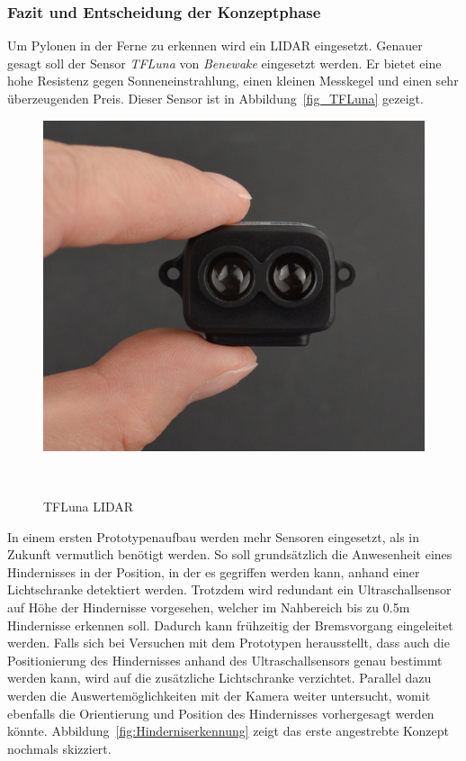 \documentclass[main.tex]{subfiles} %
\begin{document}
\subsubsection*{Fazit und Entscheidung der Konzeptphase}

Um Pylonen in der Ferne zu erkennen wird ein LIDAR eingesetzt. Genauer gesagt
soll der Sensor \textit{TFLuna} von \textit{Benewake} eingesetzt werden. Er
bietet eine hohe Resistenz gegen Sonneneinstrahlung, einen kleinen Messkegel
und einen sehr überzeugenden Preis. Dieser Sensor ist in
Abbildung~\ref{fig_TFLuna} gezeigt.

\begin{figure}[h!]
    \centering
    \includegraphics[width=0.75\linewidth]{./fig_Hinderniserkennung/TFLuna_Benewake.png}
    \caption{TFLuna LIDAR}~\label{fig:TFLuna}
\end{figure}

In einem ersten Prototypenaufbau werden mehr Sensoren eingesetzt, als in
Zukunft vermutlich benötigt werden. So soll grundsätzlich die Anwesenheit eines
Hindernisses in der Position, in der es gegriffen werden kann, anhand einer
Lichtschranke detektiert werden. Trotzdem wird redundant ein Ultraschallsensor
auf Höhe der Hindernisse vorgesehen, welcher im Nahbereich bis zu 0.5m
Hindernisse erkennen soll. Dadurch kann frühzeitig der Bremsvorgang eingeleitet
werden. Falls sich bei Versuchen mit dem Prototypen herausstellt, dass auch die
Positionierung des Hindernisses anhand des Ultraschallsensors genau bestimmt
werden kann, wird auf die zusätzliche Lichtschranke verzichtet. Parallel dazu
werden die Auswertemöglichkeiten mit der Kamera weiter untersucht, womit
ebenfalls die Orientierung und Position des Hindernisses vorhergesagt werden
könnte. Abbildung~\ref{fig:Hinderniserkennung} zeigt das erste angestrebte
Konzept nochmals skizziert.
\end{document}
